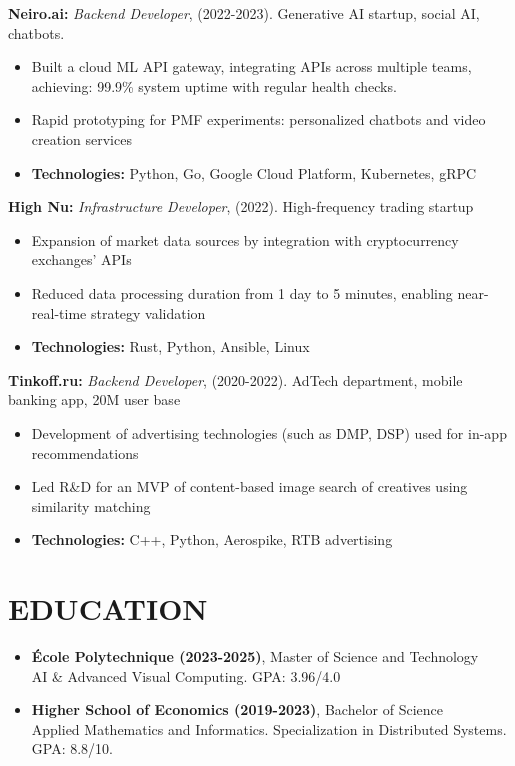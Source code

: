 \documentclass[paper=a4,fontsize=11pt]{scrartcl} %
\newcommand{\sepspace}{\vspace*{0em}}		%
\newcommand{\NewPart}[1]{\section*{\uppercase{#1}}}
\begin{document}
 \textbf{Neiro.ai:} \textit{Backend Developer}, (2022-2023). Generative AI startup, social AI, chatbots.
    \begin{itemize}
       \itemsep 0em 
        \item Built a cloud ML API gateway, integrating APIs across multiple teams, achieving: 99.9\% system uptime with regular health checks.
        \item Rapid prototyping for PMF experiments: personalized chatbots and video creation services
        \item \textbf{Technologies:} Python, Go, Google Cloud Platform, Kubernetes, gRPC
    \end{itemize}

\textbf{High Nu:} \textit{Infrastructure Developer}, (2022). High-frequency trading startup
    \begin{itemize}
      \itemsep 0em 
        \item Expansion of market data sources by integration with cryptocurrency exchanges' APIs
        \item Reduced data processing duration from 1 day to 5 minutes, enabling near-real-time strategy validation
        \item \textbf{Technologies:} Rust, Python, Ansible, Linux
    \end{itemize}

    
 \textbf{Tinkoff.ru:} \textit{Backend Developer}, (2020-2022). AdTech department, mobile banking app, 20M user base
    \begin{itemize}
       \itemsep 0em 
        \item Development of advertising technologies (such as DMP, DSP) used for in-app recommendations
        \item Led R\&D for an MVP of content-based image search of creatives using similarity matching
        \item \textbf{Technologies:} C++, Python, Aerospike, RTB advertising
    \end{itemize}

\sepspace

\NewPart{Education}{}

\begin{itemize}
    \item \textbf{École Polytechnique (2023-2025)}, Master of Science and Technology \\  AI \& Advanced Visual Computing. \hfill GPA: 3.96/4.0
    \item \textbf{Higher School of Economics (2019-2023)}, Bachelor of Science \\  Applied Mathematics and Informatics. Specialization in Distributed Systems. \hfill GPA: 8.8/10. 
\end{itemize}
\end{document}
